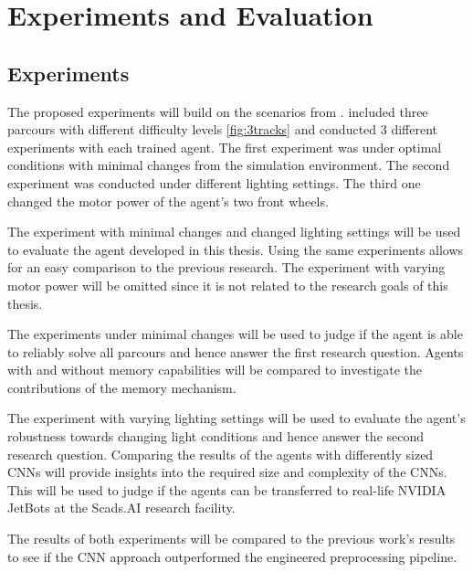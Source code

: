 \chapter{Experiments and Evaluation}
\label{cha:Experiments and Evaluation}

\section{Experiments}

The proposed experiments will build on the scenarios from \autocite{maximilian}. \autocite{maximilian} included three parcours with different difficulty levels \ref*{fig:3tracks} and conducted 3 different experiments with each trained agent. The first experiment was under optimal conditions with minimal changes from the simulation environment. The second experiment was conducted under different lighting settings. The third one changed the motor power of the agent's two front wheels.

The experiment with minimal changes and changed lighting settings will be used to evaluate the agent developed in this thesis. Using the same experiments allows for an easy comparison to the previous research. The experiment with varying motor power will be omitted since it is not related to the research goals of this thesis.

The experiments under minimal changes will be used to judge if the agent is able to reliably solve all parcours and hence answer the first research question. Agents with and without memory capabilities will be compared to investigate the contributions of the memory mechanism.

The experiment with varying lighting settings will be used to evaluate the agent's robustness towards changing light conditions and hence answer the second research question. Comparing the results of the agents with differently sized CNNs will provide insights into the required size and complexity of the CNNs. This will be used to judge if the agents can be transferred to real-life NVIDIA JetBots at the Scads.AI research facility.

The results of both experiments will be compared to the previous work's results to see if the CNN approach outperformed the engineered preprocessing pipeline.


